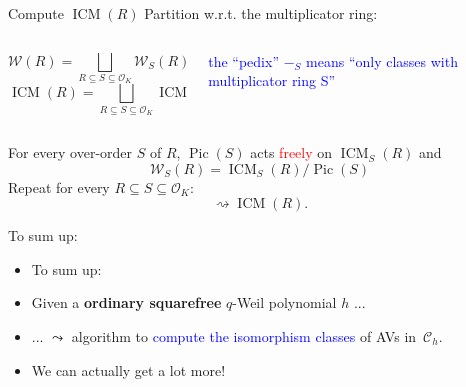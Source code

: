 \documentclass[usenames,dvipsnames]{beamer}
\DeclareMathOperator{\ICM}{ICM}
\DeclareMathOperator{\Pic}{Pic}
\newcommand{\cC}{{\mathcal C}}
\newcommand{\cO}{{\mathcal O}}
\newcommand{\cW}{{\mathcal W}}
\newcommand{\red}[1]{\textcolor{red}{#1}}
\newcommand{\blue}[1]{\textcolor{blue}{#1}}
\begin{document}
\begin{frame}{ Compute $\ICM(R)$ }
\pause 
    Partition w.r.t. the multiplicator ring:
    \begin{columns}
    \begin{column}{0.5\textwidth}
      \[ \cW(R) = \bigsqcup_{R\subseteq S \subseteq \cO_K} \cW_S(R)\]
      \[ \ICM(R) = \bigsqcup_{R\subseteq S \subseteq \cO_K} \ICM_S(R)\]
    \end{column}
\pause
    \begin{column}{0.5\textwidth}  %
    \begin{center}
    \textcolor{blue}{\parbox{10em}{the ``pedix'' $-_S$ means ``only classes with multiplicator ring S''}} 
    \end{center}
    \end{column}
    \end{columns}
\pause
    \begin{theorem}
    For every over-order $S$ of $R$, $\Pic(S)$ acts \red{freely} on $\ICM_S(R)$ and
    \[ \cW_S(R) = \ICM_S(R) / \Pic(S) \]
\pause
    Repeat for every $R\subseteq S \subseteq \cO_K$:
    \[ \rightsquigarrow \ICM(R).\]
    \end{theorem}
\end{frame}

\begin{frame}{ To sum up: }
    \begin{itemize}
    \item To sum up:
\pause
    \item Given a {\bf ordinary squarefree} $q$-Weil polynomial $h$ ...
\pause
    \item ... $\leadsto$ algorithm to \blue{compute the isomorphism classes} of AVs in~$\cC_h$.
\pause    
    \item We can actually get a lot more!
    \end{itemize}
\end{frame}
\end{document}
